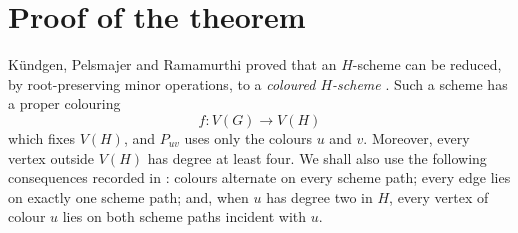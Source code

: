 \documentclass[11pt]{amsart}
\begin{document}
\section{Proof of the theorem}

K\"undgen, Pelsmajer and Ramamurthi proved that an $H$-scheme can be
reduced, by root-preserving minor operations, to a \emph{coloured
$H$-scheme} \cite[Lemma~3.3]{KundgenPelsmajerRamamurthi2015}.  Such a
scheme has a proper colouring
\[
                         f:V(G)\longrightarrow V(H)
\]
which fixes $V(H)$, and $P_{uv}$ uses only the colours $u$ and $v$.
Moreover, every vertex outside $V(H)$ has degree at least four.  We shall
also use the following consequences recorded in
\cite[Remark~3.2(1), (2), and (7)]{KundgenPelsmajerRamamurthi2015}:
colours alternate on every scheme path; every edge lies on exactly one
scheme path; and, when $u$ has degree two in $H$, every vertex of colour
$u$ lies on both scheme paths incident with $u$.
\end{document}
